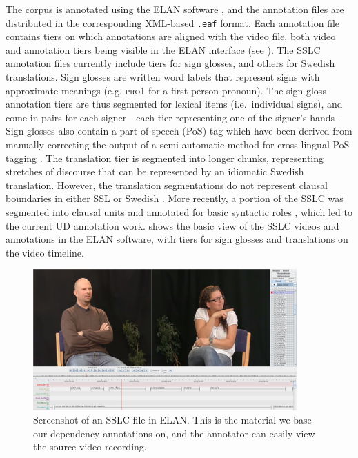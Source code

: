 \documentclass[11pt]{article}
\begin{document}
The corpus is annotated using the ELAN software \cite{Wittenburg2006elan}, and the annotation files are distributed in the corresponding XML-based \texttt{.eaf} format. Each annotation file contains tiers on which annotations are aligned with the video file, both video and annotation tiers being visible in the ELAN interface (see ). The SSLC annotation files currently include tiers for sign glosses, and others for Swedish translations. Sign glosses are written word labels that represent signs with approximate meanings (e.g. \textsc{pro1} for a first person pronoun). The sign gloss annotation tiers are thus segmented for lexical items (i.e.~individual signs), and come in pairs for each signer---each tier representing one of the signer's hands \cite{Mesch2015gloss}. Sign glosses also contain a part-of-speech (PoS) tag which have been derived from manually correcting the output of a semi-automatic method for cross-lingual PoS tagging \cite{Ostling2015enriching}. The translation tier is segmented into longer chunks, representing stretches of discourse that can be represented by an idiomatic Swedish translation. However, the translation segmentations do not represent clausal boundaries in either SSL or Swedish \cite{Borstell2014segmenting}. More recently, a portion of the SSLC was segmented into clausal units and annotated for basic syntactic roles \cite{Borstell2016syntactic}, which led to the current UD annotation work.  shows the basic view of the SSLC videos and annotations in the ELAN software, with tiers for sign glosses and translations on the video timeline.

\begin{figure}[p]
	\centering
	\includegraphics[width=0.9\textwidth]{sslc_elan.png}
	\caption{Screenshot of an SSLC file in ELAN. This is the material we base
    our dependency annotations on, and the annotator can easily view the
    source video recording.}
	\label{fig:sslc_elan}
\end{figure}
\end{document}
